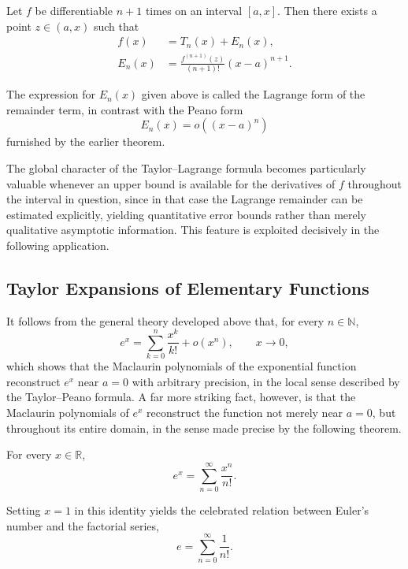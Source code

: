 \begin{theorem}
Let $f$ be differentiable $n+1$ times on an interval $[a,x]$. Then there exists a point $z \in (a,x)$ such that
\[
\begin{aligned}
f(x) &= T_n(x) + E_n(x), \\
E_n(x) &= \frac{f^{(n+1)}(z)}{(n+1)!} (x-a)^{n+1}.
\end{aligned}
\]

The expression for $E_n(x)$ given above is called the Lagrange form of the remainder term, in contrast with the Peano form
\[
E_n(x) = o((x-a)^n)
\]
furnished by the earlier theorem.
\end{theorem}

The global character of the Taylor--Lagrange formula becomes particularly valuable whenever an upper bound is available for the derivatives of $f$ throughout the interval in question, since in that case the Lagrange remainder can be estimated explicitly, yielding quantitative error bounds rather than merely qualitative asymptotic information. This feature is exploited decisively in the following application.

\subsection{Taylor Expansions of Elementary Functions}

It follows from the general theory developed above that, for every $n \in \mathbb{N}$, \[
e^x = \sum_{k=0}^{n} \frac{x^k}{k!} + o(x^n), \qquad x \to 0,
\] which shows that the Maclaurin polynomials of the exponential function reconstruct $e^x$ near $a = 0$ with arbitrary precision, in the local sense described by the Taylor--Peano formula. A far more striking fact, however, is that the Maclaurin polynomials of $e^x$ reconstruct the function not merely near $a=0$, but throughout its entire domain, in the sense made precise by the following theorem.

\begin{theorem}
For every $x \in \mathbb{R}$,
\[
e^x = \sum_{n=0}^{\infty} \frac{x^n}{n!}.
\]

\end{theorem}

Setting $x = 1$ in this identity yields the celebrated relation between Euler's number and the factorial series,
\[
e = \sum_{n=0}^{\infty} \frac{1}{n!}.
\]

